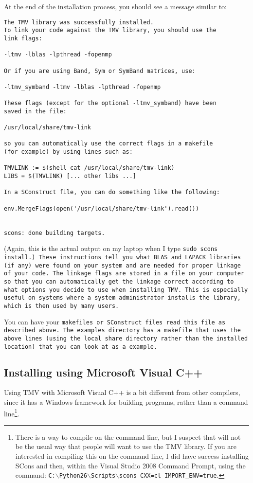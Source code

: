 \begin{enumerate}
At the end of the installation process, you should see a message similar to:
\begin{verbatim}
The TMV library was successfully installed.  
To link your code against the TMV library, you should use the 
link flags: 

-ltmv -lblas -lpthread -fopenmp

Or if you are using Band, Sym or SymBand matrices, use: 

-ltmv_symband -ltmv -lblas -lpthread -fopenmp

These flags (except for the optional -ltmv_symband) have been
saved in the file:

/usr/local/share/tmv-link

so you can automatically use the correct flags in a makefile
(for example) by using lines such as:

TMVLINK := $(shell cat /usr/local/share/tmv-link)
LIBS = $(TMVLINK) [... other libs ...]

In a SConstruct file, you can do something like the following:

env.MergeFlags(open('/usr/local/share/tmv-link').read())


scons: done building targets.
\end{verbatim}
(Again, this is the actual output on my laptop when I type \tt{sudo scons install}.)
These instructions tell you what BLAS and LAPACK libraries (if any) were found on your system and 
are needed for proper linkage of your code.  The linkage flags are stored in a file on your
computer so that you can automatically get the linkage correct according to what options
you decide to use when installing TMV.  This is especially useful on systems where a
system administrator installs the library, which is then used by many users.  

You can have your \tt{makefile}s or \tt{SConstruct} files read this file as described above.
The \tt{examples} directory has a \tt{makefile} that uses the above lines
(using the local \tt{share} directory rather than the installed location)
that you can look at as a example.

\end{enumerate}

\subsection{Installing using Microsoft Visual C++}
\label{Install_Microsoft}

Using TMV with Microsoft Visual C++ is a bit different from other compilers,
since it has a Windows framework for building programs, rather than a command 
line\footnote{
There is a way to compile on the command line, but I suspect that will not be the 
usual way that people will want to use the TMV library.  If you are interested in compiling
this on the command line, I did have success installing SCons and then, within the
Visual Studio 2008 Command Prompt, using the command:
\texttt{C:$\backslash$Python26$\backslash$Scripts$\backslash$scons CXX=cl IMPORT\_ENV=true}.}.


